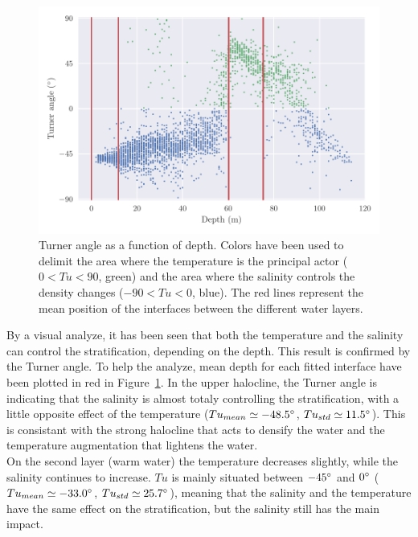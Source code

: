 \documentclass[12pt,a4paper]{article}
\begin{document}
\begin{figure}[h]
  \centering
  \includegraphics{turner}
  \caption{\label{fig:turner}Turner angle as a function of depth.
    Colors have been used to delimit the area where the temperature
    is the principal actor ($0<Tu<90$, green)
    and the area where the salinity controls the density changes ($-90<Tu<0$, blue).
    The red lines represent the mean position of the interfaces between the
    different water layers.}
\end{figure}
By a visual analyze, it has been seen that both the temperature and the salinity can control
the stratification, depending on the depth. This result is confirmed by the
Turner angle. To help the analyze, mean depth for each
fitted interface have been plotted in red in Figure~\ref{fig:turner}.
In the upper halocline, the Turner angle is indicating that the salinity
is almost totaly controlling the stratification, with a little opposite
effect of the temperature ($Tu_{mean} \simeq -48.5^{\circ}$, $Tu_{std} \simeq 11.5^{\circ}$).
This is consistant with the strong halocline that acts to densify the
water and the temperature augmentation that lightens the water.\\
On the second layer (warm water) the temperature decreases slightly,
while the salinity continues to increase.
$Tu$ is mainly situated between $-45^{\circ}$ and $0^{\circ}$
($Tu_{mean} \simeq -33.0^{\circ}$,
$Tu_{std} \simeq 25.7^{\circ}$), meaning that
the salinity and the temperature have the same effect on the stratification,
but the salinity still has the main impact.\\
\end{document}
